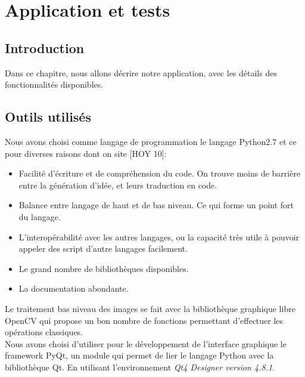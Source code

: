 
\chapter{Application et tests} %

\label{Chapter3} %



\section{Introduction}

Dans ce chapitre, nous allons décrire notre application, avec les détails des fonctionnalités disponibles.


\section{Outils utilisés}

\indent Nous avons choisi comme langage de programmation le langage Python2.7 et ce pour diverses raisons dont on site [HOY 10]:\\
\begin{itemize}

\item Facilité d’écriture et de compréhension du code. On trouve moins de barrière entre la génération d'idée, et leurs traduction en code.\\
\item Balance entre langage de haut et de bas niveau. Ce qui forme un point fort du langage.\\
\item L'interopérabilité avec les autres langages, ou la capacité très utile à pouvoir appeler des script d'autre langages facilement.\\
\item Le grand nombre de bibliothèques disponibles.\\
\item La documentation abondante.

\end{itemize}
\indent Le traitement bas niveau des images se fait avec la bibliothèque graphique libre OpenCV qui propose un bon nombre de fonctions permettant d'effectuer les opérations classiques.\\
\indent Nous avons choisi d'utiliser pour le développement de l'interface graphique le framework PyQt, un module qui permet de lier le langage Python avec la bibliothèque Qt. En utilisant l'environnement \textit{Qt4 Designer version 4.8.1}.

